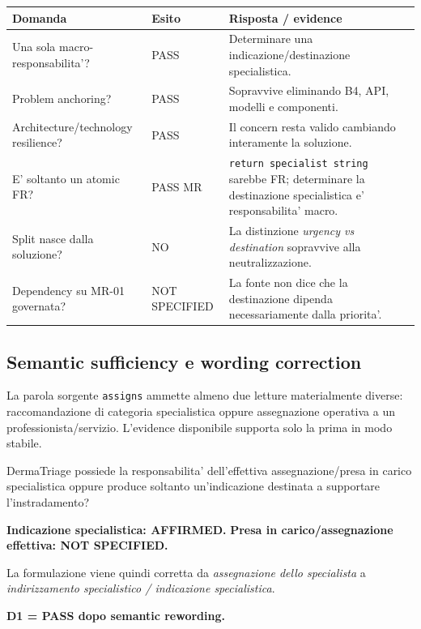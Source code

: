 \documentclass[11pt,a4paper]{article}
\begin{document}
\begin{tabularx}{\textwidth}{L{62mm}L{21mm}Y}
\toprule
\textbf{Domanda} & \textbf{Esito} & \textbf{Risposta / evidence} \\
\midrule
Una sola macro-responsabilita'? & PASS & Determinare una indicazione/destinazione specialistica. \\
Problem anchoring? & PASS & Sopravvive eliminando B4, API, modelli e componenti. \\
Architecture/technology resilience? & PASS & Il concern resta valido cambiando interamente la soluzione. \\
E' soltanto un atomic FR? & PASS MR & \texttt{return specialist string} sarebbe FR; determinare la destinazione specialistica e' responsabilita' macro. \\
Split nasce dalla soluzione? & NO & La distinzione \emph{urgency vs destination} sopravvive alla neutralizzazione. \\
Dependency su MR-01 governata? & NOT SPECIFIED & La fonte non dice che la destinazione dipenda necessariamente dalla priorita'. \\
\bottomrule
\end{tabularx}

\subsection{Semantic sufficiency e wording correction}

La parola sorgente \texttt{assigns} ammette almeno due letture materialmente diverse: raccomandazione di categoria specialistica oppure assegnazione operativa a un professionista/servizio. L'evidence disponibile supporta solo la prima in modo stabile.

\begin{ddtacheck}[title={Smallest critical proposition}]
DermaTriage possiede la responsabilita' dell'effettiva assegnazione/presa in carico specialistica oppure produce soltanto un'indicazione destinata a supportare l'instradamento?
\end{ddtacheck}

\textbf{Indicazione specialistica: AFFIRMED.}\quad
\textbf{Presa in carico/assegnazione effettiva: NOT SPECIFIED.}

La formulazione viene quindi corretta da \emph{assegnazione dello specialista} a \emph{indirizzamento specialistico / indicazione specialistica}.

\begin{ddtacore}[title={MR-02 disposition}]
\textbf{D1 = PASS dopo semantic rewording.}
\end{ddtacore}
\end{document}
